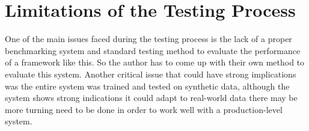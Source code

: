 \section{Limitations of the Testing Process}

One of the main issues faced during the testing process is the lack of a proper benchmarking system and standard testing method to evaluate the performance of a framework like this. So the author has to come up with their own method to evaluate this system. Another critical issue that could have strong implications was the entire system was trained and tested on synthetic data, although the system shows strong indications it could adapt to real-world data there may be more turning need to be done in order to work well with a production-level system.